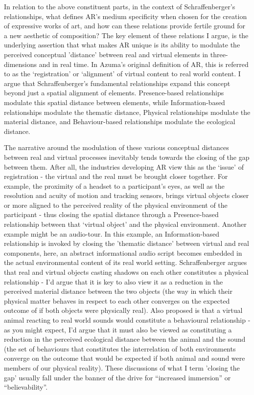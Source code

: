 In relation to the above constituent parts, in the context of Schraffenberger’s relationships, what defines AR’s medium specificity when chosen for the creation of expressive works of art, and how can these relations provide fertile ground for a new aesthetic of composition? The key element of these relations I argue, is the underlying assertion that what makes AR unique is its ability to modulate the perceived conceptual ’distance’ between real and virtual elements in three-dimensions and in real time. In Azuma’s \citep[]{azuma1997} original definition of AR, this is referred to as the ‘registration’ or ‘alignment’ of virtual content to real world content. I argue that Schraffenberger’s fundamental relationships expand this concept beyond just a spatial alignment of elements. Presence-based relationships modulate this spatial distance between elements, while Information-based relationships modulate the thematic distance, Physical relationships modulate the material distance, and Behaviour-based relationships modulate the ecological distance. 

The narrative around the modulation of these various conceptual distances between real and virtual processes inevitably tends towards the closing of the gap between them. After all, the industries developing AR view this as the ‘issue’ of registration - the virtual and the real must be brought closer together. For example, the proximity of a headset to a participant’s eyes, as well as the resolution and acuity of motion and tracking sensors, brings virtual objects closer or more aligned to the perceived reality of the physical environment of the participant - thus closing the spatial distance through a Presence-based relationship between that ‘virtual object’ and the physical environment. Another example might be an audio-tour. In this example, an Information-based relationship is invoked by closing the ’thematic distance’ between virtual and real components, here, an abstract informational audio script becomes embedded in the actual environmental content of its real world setting. Schraffenberger argues that real and virtual objects casting shadows on each other constitutes a physical relationship - I’d argue that it is key to also view it as a reduction in the perceived material distance between the two objects (the way in which their physical matter behaves in respect to each other converges on the expected outcome of if both objects were physically real). Also proposed is that a virtual animal reacting to real world sounds would constitute a behavioural relationship - as you might expect, I’d argue that it must also be viewed as constituting a reduction in the perceived ecological distance between the animal and the sound (the set of behaviours that constitutes the interrelation of both environments converge on the outcome that would be expected if both animal and sound were members of our physical reality). These discussions of what I term ’closing the gap’ usually fall under the banner of the drive for “increased immersion” or “believability”. 


